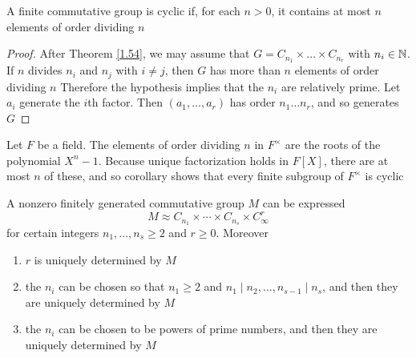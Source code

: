 \documentclass[11pt]{article}
\begin{document}
\begin{corollary}[]
A finite commutative group is cyclic if, for each \(n>0\), it contains at most \(n\) elements of
order dividing \(n\)
\end{corollary}

\begin{proof}
After Theorem \ref{1.54}, we may assume that \(G=C_{n_1}\times\dots\times C_{n_r}\) with \(n_i\in\mathbb{N}\). If \(n\)
divides \(n_i\) and \(n_j\) with \(i\neq j\), then \(G\) has more than \(n\) elements of order
dividing \(n\)
Therefore the hypothesis implies that the \(n_i\) are relatively prime.
Let \(a_i\) generate the \(i\)th factor. Then \((a_1,\dots,a_r)\) has order \(n_1\dots n_r\), and so
generates \(G\)
\end{proof}

\begin{examplle}[]
\label{1.56}
Let \(F\) be a field. The elements of order dividing \(n\) in \(F^{\times}\) are the roots of the
polynomial \(X^n-1\). Because unique factorization holds in \(F[X]\), there are at most \(n\) of
these, and so corollary shows that every finite subgroup of \(F^{\times}\) is cyclic
\end{examplle}

\begin{theorem}[]
A nonzero finitely generated commutative group \(M\) can be expressed
\begin{equation*}
M\approx C_{n_1}\times\cdots\times C_{n_s}\times C_\infty^r
\end{equation*}
for certain integers \(n_1,\dots,n_s\ge 2\) and \(r\ge 0\). Moreover
\begin{enumerate}
\item \(r\) is uniquely determined by \(M\)
\item the \(n_i\) can be chosen so that \(n_1\ge 2\) and \(n_1\mid n_2,\dots,n_{s-1}\mid n_s\), and then they are
uniquely determined by \(M\)
\item the \(n_i\) can be chosen to be powers of prime numbers, and then they are uniquely determined
by \(M\)
\end{enumerate}
\end{theorem}
\end{document}
